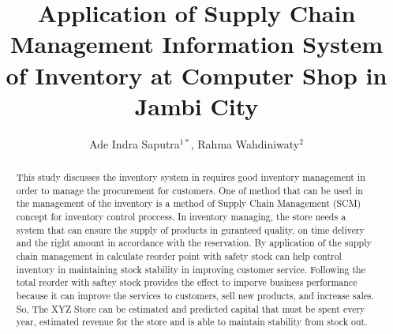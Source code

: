 \documentclass[12pt,a4paper,final]{iopart}
\begin{document}
\title[Preparing an article for INCITEST 2020]{Application of Supply Chain Management Information System of Inventory at Computer Shop in Jambi City}

\author{Ade Indra Saputra$^{1*}$, Rahma Wahdiniwaty$^{2}$}
\address{$^1$Jurusan Magister Sistem Informasi, Fakultas Pascasarjana, Universitas Komputer Indonesia}
\address{$^2$Jurusan Magister Manajemen, Fakultas Pascarsajana, Universitas Komputer Indonesia}




\begin{abstract}
This study discusses the inventory system in requires good inventory management in order to manage the procurement for customers. One of method that can be used in the management of the inventory is a method of Supply Chain Management (SCM)  concept for inventory control proccess. In inventory managing, the store needs a system that can ensure the supply of products in guranteed quality, on time delivery and the right amount in accordance with the reservation. By application of the supply chain management in calculate reorder point with safety stock can help control inventory in maintaining stock stability in improving customer service. Following the total reorder with saftey stock provides the effect to imporve business performance because it can improve the services to customers, sell new products, and increase sales. So, The XYZ Store can be estimated and predicted capital that must be spent every year, estimated revenue for the store and is able to maintain stability from stock out.


\end{abstract}
\end{document}
